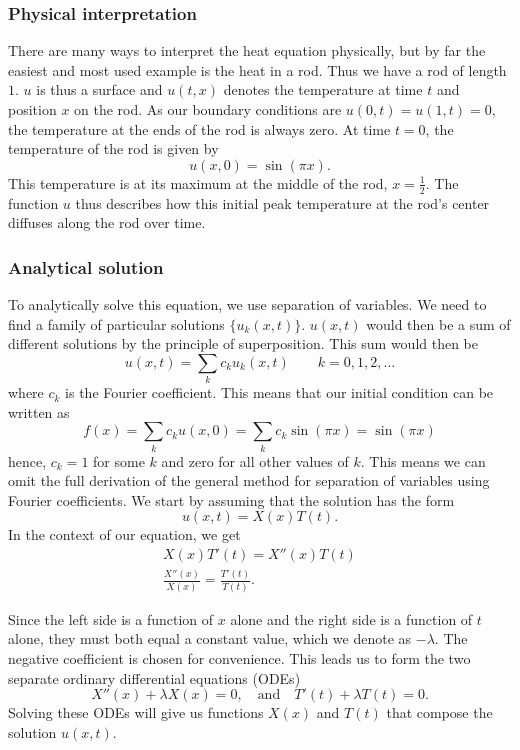 \documentclass{article}
\theoremstyle{definition}
\begin{document}
\subsubsection{Physical interpretation}
There are many ways to interpret the heat equation physically, but by far the easiest and most used example is the heat in a rod. Thus we have a rod of length $1$. $u$ is thus a surface and $u(t,x)$ denotes the temperature at time $t$ and position $x$ on the rod. As our boundary conditions are $u(0,t) = u(1,t) = 0$, the temperature at the ends of the rod is always zero. At time $t = 0$, the temperature of the rod is given by
\begin{equation*}
    u(x,0) = \sin(\pi x).
\end{equation*}
This temperature is at its maximum at the middle of the rod, $x=\tfrac{1}{2}$. The function $u$ thus describes how this initial peak temperature at the rod's center diffuses along the rod over time.

\subsubsection{Analytical solution}
To analytically solve this equation, we use separation of variables. We need to find a family of particular solutions $\{u_k(x,t)\}$. $u(x,t)$ would then be a sum of different solutions by the principle of superposition. This sum would then be
\begin{equation*}
    u(x,t) = \sum_{k}c_ku_k(x,t) \qquad k = 0,1,2,\dots
\end{equation*}
where $c_k$ is the Fourier coefficient. This means that our initial condition can be written as
\begin{equation*}
    f(x) = \sum_{k}c_ku(x,0) = \sum_k c_k\sin(\pi x) = \sin(\pi x)
\end{equation*}
hence, $c_k = 1$ for some $k$ and zero for all other values of $k$. This means we can omit the full derivation of the general method for separation of variables using Fourier coefficients. 
We start by assuming that the solution has the form
\begin{equation*}
    u(x,t) = X(x)T(t).
\end{equation*}
In the context of our equation, we get
\begin{gather*}
    X(x) T'(t) = X''(x) T(t) \\
    \frac{X''(x)}{X(x)} = \frac{T'(t)}{T(t)}. 
\end{gather*}

Since the left side is a function of $x$ alone and the right side is a function of $t$ alone, they must both equal a constant value, which we denote as $-\lambda$. The negative coefficient is chosen for convenience. This leads us to form the two separate ordinary differential equations (ODEs)
\begin{equation*}
    X''(x) + \lambda X(x) = 0,\quad \text{and} \quad T'(t) + \lambda T(t) = 0. 
\end{equation*}
Solving these ODEs will give us functions $X(x)$ and $T(t)$ that compose the solution $u(x,t)$.
\end{document}
